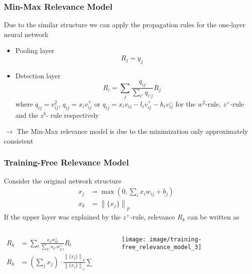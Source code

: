 \documentclass{beamer}
\newcommand\norm[1]{\left\lVert#1\right\rVert}
\begin{document}
\begin{frame}
\frametitle{Min-Max Relevance Model}
Due to the similar structure we can apply the propagation rules for the one-layer neural network
\begin{itemize}
\item Pooling layer
\begin{equation*}
R_j = y_j
\end{equation*}

\item Detection layer
\begin{equation*}
R_i = \sum_j \frac{q_{ij}}{\sum_{i'} q_{i'j}} R_j
\end{equation*}
where $q_{ij}= v_{ij}^2$, $q_{ij}= x_i v_{ij}^+$ or $q_{ij}= x_i v_{ij} - l_i v_{ij}^+ - h_i v_{ij}^-$ for the $w^2$-rule, $z^+$-rule and the $z^b$- rule respectively
\end{itemize}
\vspace{0.5cm}

$\rightarrow$ The Min-Max relevance model is due to the minimization only approximately consistent
\end{frame}



\begin{frame}
\frametitle{Training-Free Relevance Model}
Consider the original network structure
\begin{align*}
x_j &= \max(0,\sum_ix_i w_{ij} + b_j)\\
x_k &= \norm{\{x_j\}}_p
\end{align*}
If the upper layer was explained by the $z^+$-rule, relevance $R_k$ can be written as


 \begin{columns}
          \begin{column}{5cm}
			\begin{align*}
			R_k &= \sum_l \frac{x_k w_{kl}^+}{\sum_{k'} x_{k'} w_{k'l}^+} R_l\\
			R_k &= (\sum_j x_j) \cdot \frac{\norm{\{x_j\}}_p}{\norm{\{x_j\}}_1}   \sum_l \frac{w_{kl}^+R_l}{\sum_{k'} x_{k'} w_{k'l}^+} 
			\end{align*}
            \end{column} 
            \begin{column}{5cm}
			\begin{figure}
			\label{fig1}
			\texttt{[image: image/training-free\_relevance\_model\_3]}
			\end{figure}
	\end{column}
\end{columns} 

\end{frame}
\end{document}
